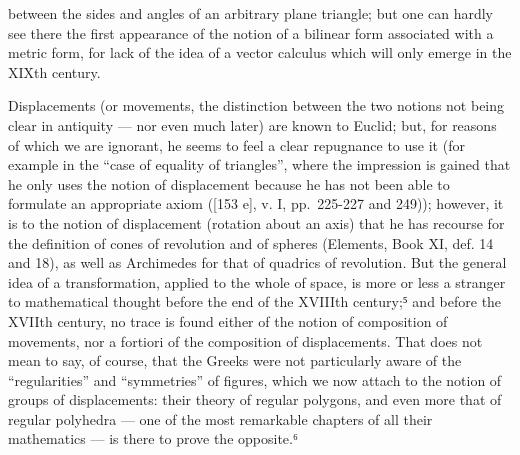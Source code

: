 between the sides and angles of an arbitrary plane triangle; but one can hardly see there the first appearance of the notion of a bilinear form associated with a metric form, for lack of the idea of a vector calculus which will only emerge in the XIXth century.

Displacements (or movements, the distinction between the two notions not being clear in antiquity --- nor even much later) are known to Euclid; but, for reasons of which we are ignorant, he seems to feel a clear repugnance to use it (for example in the ``case of equality of triangles'', where the impression is gained that he only uses the notion of displacement because he has not been able to formulate an appropriate axiom ({[}153 e{]}, v. I, pp.~225-227 and 249)); however, it is to the notion of displacement (rotation about an axis) that he has recourse for the definition of cones of revolution and of spheres (Elements, Book XI, def. 14 and 18), as well as Archimedes for that of quadrics of revolution. But the general idea of a transformation, applied to the whole of space, is more or less a stranger to mathematical thought before the end of the XVIIIth century;⁵ and before the XVIIth century, no trace is found either of the notion of composition of movements, nor a fortiori of the composition of displacements. That does not mean to say, of course, that the Greeks were not particularly aware of the ``regularities'' and ``symmetries'' of figures, which we now attach to the notion of groups of displacements: their theory of regular polygons, and even more that of regular polyhedra --- one of the most remarkable chapters of all their mathematics --- is there to prove the opposite.⁶

